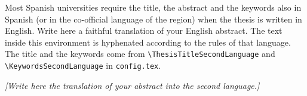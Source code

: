 \begin{abstractsecondlanguage}

\begin{guidance}
Most Spanish universities require the title, the abstract and the keywords also in
Spanish (or in the co-official language of the region) when the thesis is written in
English. Write here a faithful translation of your English abstract. The text inside
this environment is hyphenated according to the rules of that language. The title and
the keywords come from \texttt{\textbackslash ThesisTitleSecondLanguage} and
\texttt{\textbackslash KeywordsSecondLanguage} in \texttt{config.tex}.
\end{guidance}

\textit{[Write here the translation of your abstract into the second language.]}

\end{abstractsecondlanguage}

